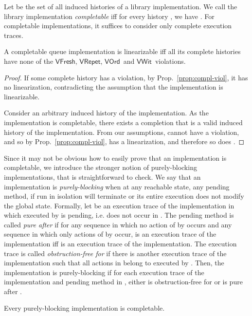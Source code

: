 \documentclass{LMCS}
\newcommand{\VFresh}{\ensuremath{\mathsf{VFresh}}}
\newcommand{\VRepet}{\ensuremath{\mathsf{VRepet}}}
\newcommand{\VOrd}{\ensuremath{\mathsf{VOrd}}}
\newcommand{\VWit}{\ensuremath{\mathsf{VWit}}}
\begin{document}
Let  be the set of all induced histories of a library implementation.
We call the library implementation \emph{completable} iff for every history , we have .
For completable implementations, it suffices to consider only complete execution traces.

\begin{thm}\label{thm:no-violations}
A completable queue implementation is linearizable 
iff all its complete histories have none of the \VFresh, \VRepet, \VOrd\ and \VWit\ violations.
\end{thm}

\begin{proof}\hfill

\noindent{\bf()} If some complete history has a violation, by Prop.~\ref{prop:compl-viol}, it has no linearization, contradicting the assumption that the implementation is linearizable.

\noindent{\bf()}
Consider an arbitrary induced history  of the implementation. 
As the implementation is completable, 
there exists a completion  that is a valid induced history of the implementation.
From our assumptions,  cannot have a violation, and so by
Prop.~\ref{prop:compl-viol},  has a linearization, and therefore so does .
\end{proof}

Since it may not be obvious how to easily prove that an implementation is
completable, we introduce the stronger notion of purely-blocking
implementations, that is straightforward to check.
We say that an implementation is \emph{purely-blocking} when at any reachable state,
any pending method, if run in isolation will terminate or its entire execution does
not modify the global state.
Formally, let  be an execution trace of the implementation in which  executed by  is pending, i.e.  does not occur in .
The pending method  is called {\em pure after } if for any sequence  in which no action of  by  occurs and any sequence  in which only actions of  by  occur,  is an execution trace of the implementation iff  is an execution trace of the implementation.
The execution trace  is called {\em obstruction-free for } if there is another execution trace  of the implementation such that all actions in  belong to  executed by .
Then, the implementation is purely-blocking if for each execution trace  of the implementation and pending method  in , either  is obstruction-free for  or  is pure after .

\begin{prop}\label{prop:pb}
Every purely-blocking implementation is completable.
\end{prop}
\end{document}
